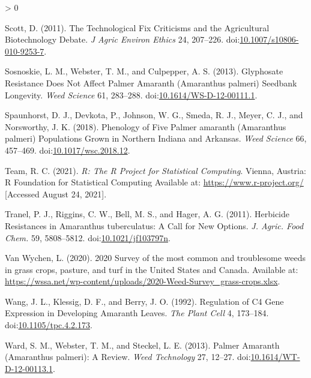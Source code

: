 \documentclass[utf8]{frontiersSCNS}
\newlength{\cslhangindent}
\newenvironment{CSLReferences}[2] %
 {%
  \setlength{\parindent}{0pt}
  \ifodd #1 \everypar{\setlength{\hangindent}{\cslhangindent}}\ignorespaces\fi
  \ifnum #2 > 0
  \setlength{\parskip}{#2\baselineskip}
  \fi
 }%
 {}
\begin{document}
\begin{CSLReferences}{1}{0}
\leavevmode\hypertarget{ref-scott2011}{}%
Scott, D. (2011). The {Technological Fix Criticisms} and the
{Agricultural Biotechnology Debate}. \emph{J Agric Environ Ethics} 24,
207--226.
doi:\href{https://doi.org/10.1007/s10806-010-9253-7}{10.1007/s10806-010-9253-7}.

\leavevmode\hypertarget{ref-sosnoskie2013}{}%
Sosnoskie, L. M., Webster, T. M., and Culpepper, A. S. (2013).
Glyphosate {Resistance Does Not Affect Palmer Amaranth} ({Amaranthus}
palmeri) {Seedbank Longevity}. \emph{Weed Science} 61, 283--288.
doi:\href{https://doi.org/10.1614/WS-D-12-00111.1}{10.1614/WS-D-12-00111.1}.

\leavevmode\hypertarget{ref-spaunhorst2018}{}%
Spaunhorst, D. J., Devkota, P., Johnson, W. G., Smeda, R. J., Meyer, C.
J., and Norsworthy, J. K. (2018). Phenology of {Five Palmer} amaranth
({Amaranthus} palmeri) {Populations Grown} in {Northern Indiana} and
{Arkansas}. \emph{Weed Science} 66, 457--469.
doi:\href{https://doi.org/10.1017/wsc.2018.12}{10.1017/wsc.2018.12}.

\leavevmode\hypertarget{ref-rcoreteam2021}{}%
Team, R. C. (2021). \emph{R: {The R Project} for {Statistical
Computing}}. {Vienna, Austria}: {R Foundation for Statistical Computing}
Available at: \url{https://www.r-project.org/} {[}Accessed August 24,
2021{]}.

\leavevmode\hypertarget{ref-tranel2011}{}%
Tranel, P. J., Riggins, C. W., Bell, M. S., and Hager, A. G. (2011).
Herbicide {Resistances} in {Amaranthus} tuberculatus: {A Call} for {New
Options}. \emph{J. Agric. Food Chem.} 59, 5808--5812.
doi:\href{https://doi.org/10.1021/jf103797n}{10.1021/jf103797n}.

\leavevmode\hypertarget{ref-vanwychen2020}{}%
Van Wychen, L. (2020). 2020 {Survey} of the most common and troublesome
weeds in grass crops, pasture, and turf in the {United States} and
{Canada}. Available at:
\url{https://wssa.net/wp-content/uploads/2020-Weed-Survey_grass-crops.xlsx}.

\leavevmode\hypertarget{ref-wang1992}{}%
Wang, J. L., Klessig, D. F., and Berry, J. O. (1992). Regulation of {C4
Gene Expression} in {Developing Amaranth Leaves}. \emph{The Plant Cell}
4, 173--184.
doi:\href{https://doi.org/10.1105/tpc.4.2.173}{10.1105/tpc.4.2.173}.

\leavevmode\hypertarget{ref-ward2013}{}%
Ward, S. M., Webster, T. M., and Steckel, L. E. (2013). Palmer
{Amaranth} ({Amaranthus} palmeri): {A Review}. \emph{Weed Technology}
27, 12--27.
doi:\href{https://doi.org/10.1614/WT-D-12-00113.1}{10.1614/WT-D-12-00113.1}.


\end{CSLReferences}
\end{document}
